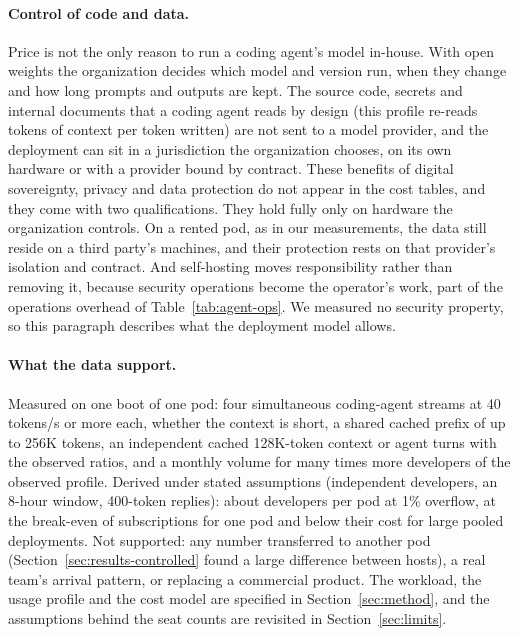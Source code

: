 \paragraph{Control of code and data.}
Price is not the only reason to run a coding agent's model in-house. With open weights the organization decides which
model and version run, when they change and how long prompts and outputs are kept. The source code, secrets and
internal documents that a coding agent reads by design (this profile re-reads  tokens
of context per token written) are not sent to a model provider, and the deployment can sit in a jurisdiction the
organization chooses, on its own hardware or with a provider bound by contract. These benefits of digital sovereignty,
privacy and data protection do not appear in the cost tables, and they come with two qualifications. They hold fully
only on hardware the organization controls. On a rented pod, as in our measurements, the data still reside on a third
party's machines, and their protection rests on that provider's isolation and contract. And self-hosting moves
responsibility rather than removing it, because security operations become the operator's work, part of the
operations overhead of Table~\ref{tab:agent-ops}. We measured no security property, so this paragraph describes what
the deployment model allows.

\paragraph{What the data support.}
Measured on one boot of one pod: four simultaneous coding-agent streams at 40 tokens/s or more each, whether the
context is short, a shared cached prefix of up to 256K tokens, an independent cached 128K-token context or agent turns
with the observed ratios, and a monthly volume for many times more developers of the observed profile. Derived under
stated assumptions (independent developers, an 8-hour window, 400-token replies): about
 developers per pod at 1\% overflow, at the break-even of subscriptions for one pod
and below their cost for large pooled deployments. Not supported: any number transferred to another pod
(Section~\ref{sec:results-controlled} found a large difference between hosts), a real team's arrival pattern, or
replacing a commercial product. The workload, the usage profile and the cost model are specified in
Section~\ref{sec:method}, and the assumptions behind the seat counts are revisited in Section~\ref{sec:limits}.
